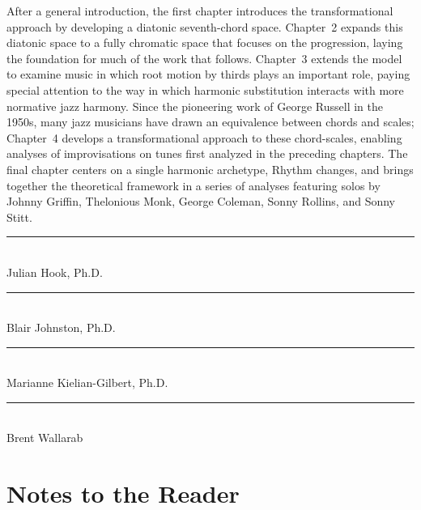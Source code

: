 After a general introduction, the first chapter introduces the
transformational approach by developing a diatonic seventh-chord space.
Chapter~2 expands this diatonic space to a fully chromatic space that focuses
on the \tfo progression, laying the foundation for much of the work that
follows. Chapter~3 extends the model to examine music in which root motion by
thirds plays an important role, paying special attention to the way in which
harmonic substitution interacts with more normative jazz harmony. Since the
pioneering work of George Russell in the 1950s, many jazz musicians have drawn
an equivalence between chords and scales; Chapter~4 develops a
transformational approach to these chord-scales, enabling analyses of
improvisations on tunes first analyzed in the preceding chapters. The final
chapter centers on a single harmonic archetype, Rhythm changes, and brings
together the theoretical framework in a series of analyses featuring solos by
Johnny Griffin, Thelonious Monk, George Coleman, Sonny Rollins, and Sonny
Stitt.

{\flushright \singlespacing

\vspace*{3em}
\rule{20em}{0.5pt} \\ Julian Hook, Ph.D.

\vspace{3em}
\rule{20em}{0.5pt} \\ Blair Johnston, Ph.D.

\vspace{3em}
\rule{20em}{0.5pt} \\ Marianne Kielian-Gilbert, Ph.D.

\vspace{3em}
\rule{20em}{0.5pt} \\ Brent Wallarab

}

\cleardoublepage
{}
{}
\singlespacing
\tableofcontents

\clearpage
{}
{}
\listoffigures


\clearpage

{}
\listoftables

\cleardoublepage

\section*{\Large Notes to the Reader}
\label{sec:notes-to-reader}


